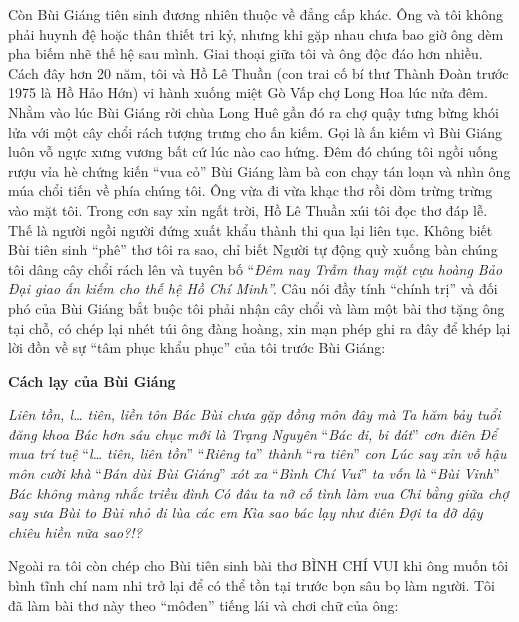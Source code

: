 \documentclass[../main.tex]{subfiles}
\begin{document}
\begin{multicols}{2}
Còn Bùi Giáng tiên sinh đương nhiên thuộc về đẳng cấp khác. Ông và tôi không phải huynh đệ hoặc thân thiết tri kỷ, nhưng khi gặp nhau chưa bao giờ ông dèm pha biếm nhẽ thế hệ sau mình. Giai thoại giữa tôi và ông độc đáo hơn nhiều. Cách đây hơn 20 năm, tôi và Hồ Lê Thuần (con trai cố bí thư Thành Ðoàn trước 1975 là Hồ Hảo Hớn) vi hành xuống miệt Gò Vấp chợ Long Hoa lúc nửa đêm. Nhằm vào lúc Bùi Giáng rời chùa Long Huê gần đó ra chợ quậy tưng bừng khói lửa với một cây chổi rách tượng trưng cho ấn kiếm. Gọi là ấn kiếm vì Bùi Giáng luôn vỗ ngực xưng vương bất cứ lúc nào cao hứng. Ðêm đó chúng tôi ngồi uống rượu vỉa hè chứng kiến “vua cỏ” Bùi Giáng làm bà con chạy tán loạn và nhìn ông múa chổi tiến về phía chúng tôi. Ông vừa đi vừa khạc thơ rồi dòm trừng trừng vào mặt tôi. Trong cơn say xỉn ngất trời, Hồ Lê Thuần xúi tôi đọc thơ đáp lễ. Thế là người ngồi người đứng xuất khẩu thành thi qua lại liên tục. Không biết Bùi tiên sinh “phê” thơ tôi ra sao, chỉ biết Người tự động quỳ xuống bàn chúng tôi dâng cây chổi rách lên và tuyên bố “\textit{Ðêm nay Trẫm thay mặt cựu hoàng Bảo Ðại giao ấn kiếm cho thế hệ Hồ Chí Minh”. }Câu nói đầy tính “chính trị” và đối phó của Bùi Giáng bắt buộc tôi phải nhận cây chổi và làm một bài thơ tặng ông tại chỗ, có chép lại nhét túi ông đàng hoàng, xin mạn phép ghi ra đây để khép lại lời đồn về sự “tâm phục khẩu phục” của tôi trước Bùi Giáng: 
\begin{blockquote}
 
\textbf{Cách lạy của Bùi Giáng} 
        
\textit{Liên tồn, l… tiên, liền tôn}        
\textit{Bác Bùi chưa gặp đồng môn đây mà}        
\textit{Ta hăm bảy tuổi đăng khoa}        
\textit{Bác hơn sáu chục mới là Trạng Nguyên}        
“\textit{Bác đi, bi đát}”\textit{ cơn điên}        
\textit{Ðể mua trí tuệ }“\textit{l… tiên, liên tồn}”        
“\textit{Riêng ta}”\textit{ thành }“\textit{ra tiên}”\textit{ con}        
\textit{Lúc say xỉn vỗ hậu môn cười khà}        
“\textit{Bán dùi Bùi Giáng}”\textit{ xót xa}        
“\textit{Bình Chí Vui}” \textit{ta vốn là }“\textit{Bùi Vinh}”        
\textit{Bác không màng nhắc triều đình}        
\textit{Có đâu ta nỡ cố tình làm vua}        
\textit{Chi bằng giữa chợ say sưa}        
\textit{Bùi to Bùi nhỏ đi lùa các em}        
\textit{Kìa sao bác lạy như điên} 
\textit{Ðợi ta đỡ dậy chiêu hiền nữa sao?!?} 

\end{blockquote}
 
Ngoài ra tôi còn chép cho Bùi tiên sinh bài thơ BÌNH CHÍ VUI khi ông muốn tôi bình tĩnh chí nam nhi trở lại để có thể tồn tại trước bọn sâu bọ làm người. Tôi đã làm bài thơ này theo “môđen” tiếng lái và chơi chữ của ông: 
\begin{blockquote}
 

\end{blockquote}
\end{multicols}
\end{document}
